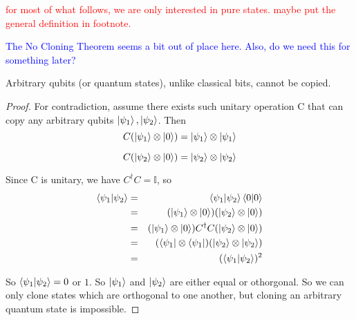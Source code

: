 \textcolor{red}{for most of what follows, we are only interested in pure states. maybe put the general definition in footnote.}

\textcolor{blue}{The No Cloning Theorem seems a bit out of place here.  Also, do we need this for something later?}
\begin{theorem} \label{no-cloning thm}
Arbitrary qubits (or quantum states), unlike classical bits, cannot be copied. 
\end{theorem} 

\begin{proof} \cite{Wehner:notes}
For contradiction, assume there exists such unitary operation C that can copy any arbitrary qubits $\ket{\psi_1}, \ket{\psi_2}$. Then
\begin{equation*}
    C(\ket{\psi_1} \otimes \ket{0})=\ket{\psi_1} \otimes \ket{\psi_1}
\end{equation*}

\begin{equation*}
C(\ket{\psi_2} \otimes \ket{0})=\ket{\psi_2} \otimes \ket{\psi_2}  
\end{equation*}
    

Since C is unitary, we have $C^\dagger C=\mathbb{I}$, so
\begin{eqnarray*}
\braket{\psi_1|\psi_2}&=&\braket{\psi_1|\psi_2}\braket{0|0}\\
&=&(\ket{\psi_1} \otimes \ket{0})(\ket{\psi_2} \otimes \ket{0})\\
&=&(\ket{\psi_1} \otimes \ket{0})C^\dagger C(\ket{\psi_2} \otimes \ket{0})\\
&=&(\bra{\psi_1} \otimes \bra{\psi_1})(\ket{\psi_2} \otimes \ket{\psi_2})\\
&=&(\braket{\psi_1 |\psi_2})^2
\end{eqnarray*}

So $\braket{\psi_1 | \psi_2}=0$ or $1$. So $\ket{\psi_1}$ and $\ket{\psi_2}$ are either equal or othorgonal. So we can only clone states which are orthogonal to one another, but cloning an arbitrary quantum state is impossible. 
\end{proof}